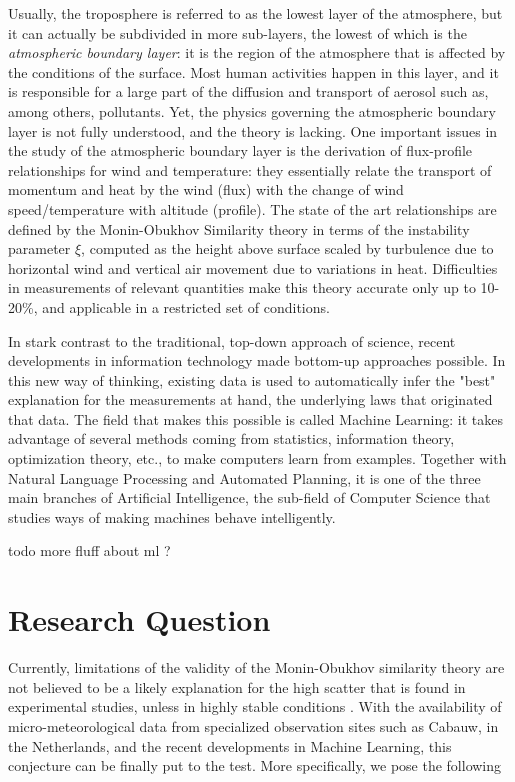 \documentclass[12pt]{book}
\begin{document}
Usually, the troposphere is referred to as the lowest layer of the atmosphere, but it can actually be subdivided in more sub-layers, the lowest of which is the \emph{atmospheric boundary layer}: it is the region of the atmosphere that is affected by the conditions of the surface. Most human activities happen in this layer, and it is responsible for a large part of the diffusion and transport of aerosol such as, among others, pollutants. Yet, the physics governing the atmospheric boundary layer is not fully understood, and the theory is lacking. One important issues in the study of the atmospheric boundary layer is the derivation of flux-profile relationships for wind and temperature: they essentially relate the transport of momentum and heat by the wind (flux) with the change of wind speed/temperature with altitude (profile). The state of the art relationships are defined by the Monin-Obukhov Similarity theory in terms of the instability parameter $\xi$, computed as the height above surface scaled by turbulence due to horizontal wind and vertical air movement due to variations in heat. Difficulties in measurements of relevant quantities make this theory accurate only up to 10-20\%, and applicable in a restricted set of conditions.

In stark contrast to the traditional, top-down approach of science, recent developments in information technology made bottom-up approaches possible. In this new way of thinking, existing data is used to automatically infer the "best" explanation for the measurements at hand, the underlying laws that originated that data. The field that makes this possible is called Machine Learning: it takes advantage of several methods coming from statistics, information theory, optimization theory, etc., to make computers learn from examples. Together with Natural Language Processing and Automated Planning, it is one of the three main branches of Artificial Intelligence, the sub-field of Computer Science that studies ways of making machines behave intelligently.

todo more fluff about ml ?

\section{Research Question}
Currently, limitations of the validity of the Monin-Obukhov similarity theory are not believed to be a likely explanation for the high scatter that is found in experimental studies, unless in highly stable conditions \cite{basicatm}. With the availability of micro-meteorological data from specialized observation sites such as Cabauw, in the Netherlands, and the recent developments in Machine Learning, this conjecture can be finally put to the test. More specifically, we pose the following \\
\end{document}
